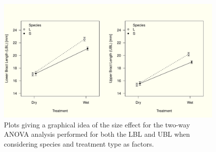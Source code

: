 \documentclass{article}
\begin{document}
\begin{figure}[H]
\centering
  \includegraphics[scale=0.6]{anova_lbl.pdf}
\caption{Plots giving a graphical idea of the size effect for the two-way ANOVA analysis performed for both the LBL and UBL when considering species and treatment type as factors.}
  \label{fig:aovi1}
\end{figure}
\end{document}
